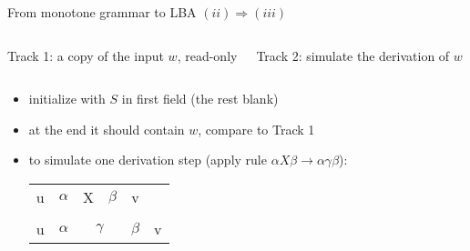 \documentclass[handout]{beamer}
\begin{document}
\begin{frame}{From monotone grammar to LBA \hfill $(ii)\Rightarrow(iii)$}

    \begin{columns}



        \alert{Track 1}: a copy of the input $w$, read-only

        \alert{Track 2}: simulate the derivation of $w$ %
        
    
        \vspace{11pt}


        
    \end{columns}

    \begin{itemize}
        \item initialize with $S$ in first field (the rest blank)
        \item at the end it should contain $w$, compare to Track 1  
        
        \bigskip
        
        \item to simulate one derivation step (apply rule $\alpha X \beta \rightarrow \alpha \gamma \beta$):

        \smallskip
        \begin{center}
            \begin{tabular}{c c c  c c c}
            \cline{1-5}
            \multicolumn{1}{|c|}{u} & $\alpha$ & \multicolumn{1}{|c|}{X} & $\beta$& \multicolumn{1}{|c|}{v} &\\ \cline{1-5}
            \vspace{0.005cm}\\ \cline{1-6}
            \multicolumn{1}{|c|}{u} & $\alpha$ & \multicolumn{2}{|c|}{$\gamma$} & $\beta$& \multicolumn{1}{|c|}{v} \\ \cline{1-6}
            \end{tabular}
        \end{center}
        \smallskip
    

\end{itemize}
\end{frame}
\end{document}
